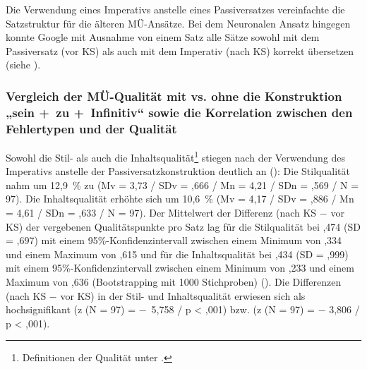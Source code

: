 Die Verwendung eines Imperativs anstelle eines Passiversatzes vereinfachte die Satzstruktur für die älteren MÜ-Ansätze. Bei dem Neuronalen Ansatz hingegen konnte Google mit Ausnahme von einem Satz alle Sätze sowohl mit dem Passiversatz (vor KS) als auch mit dem Imperativ (nach KS) korrekt übersetzen (siehe ).

\subsubsection{\label{sec:5.3.7.4}Vergleich der MÜ-Qualität mit vs. ohne die Konstruktion „sein +~zu +~Infinitiv“ sowie die Korrelation zwischen den Fehlertypen und der Qualität}

Sowohl die Stil- als auch die Inhaltsqualität\footnote{\textrm{Definitionen der Qualität unter .}} stiegen nach der Verwendung des Imperativs anstelle der Passiversatzkonstruktion deutlich an (): Die Stilqualität nahm um 12,9~\% zu (Mv = 3,73 / SDv = ,666 / Mn = 4,21 / SDn = ,569 / N = 97). Die Inhaltsqualität erhöhte sich um 10,6~\% (Mv = 4,17 / SDv = ,886 / Mn = 4,61 / SDn = ,633 / N = 97). Der Mittelwert der Differenz (nach KS $-$ vor KS) der vergebenen Qualitätspunkte pro Satz lag für die Stilqualität bei ,474 (SD = ,697) mit einem 95\%\nobreakdash-Konfidenzintervall zwischen einem Minimum von ,334 und einem Maximum von ,615 und für die Inhaltsqualität bei ,434 (SD = ,999) mit einem 95\%\nobreakdash-Konfidenzintervall zwischen einem Minimum von ,233 und einem Maximum von ,636 (Bootstrapping mit 1000 Stichproben) (). Die Differenzen (nach KS $-$ vor KS) in der Stil- und Inhaltsqualität erwiesen sich als hochsignifikant (z (N = 97) = $-$~5,758 / p < ,001) bzw. (z (N = 97) = $-$ 3,806 / p < ,001).


